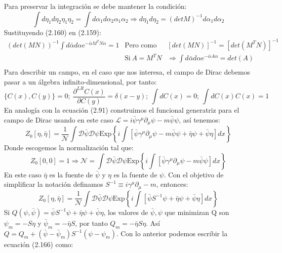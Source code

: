 Para preservar la integración se debe mantener la condición:
\begin{equation}
\int d\eta_{1}d\eta_{2}\eta_{1}\eta_{2}=\int d\alpha_{1}d\alpha_{2}\alpha_{1}\alpha_{2}\Rightarrow d\eta_{1}d\eta_{2}=(detM)^{-1}d\alpha_{1}d\alpha_{2}
\end{equation}
Sustituyendo (2.160) en (2.159):
\begin{eqnarray}
\nonumber (det(MN))^{-1}\int d\bar{\alpha}d\alpha e^{-\bar{\alpha}M^{T}N\alpha}=1&\text{Pero como}& \left[det(MN)\right]^{-1}=\left[det(M^{T}N)\right]^{-1}\\
\nonumber &\text{Si}\ A=M^TN&\Rightarrow \int d\bar{\alpha}d\alpha e^{-\bar{\alpha}A\alpha}=det(A)\\
\end{eqnarray}
Para describir un campo, en el caso que nos interesa, el campo de Dirac debemos pasar a un álgebra infinito-dimensional, por tanto:
\begin{equation}
\{C(x),C(y)\}=0; \ \frac{\partial^{LR}C(x)}{\partial C(y)}=\delta(x-y); \ \int dC(x)=0; \ \int dC(x)C(x)=1
\end{equation}
En analogía con la ecuación (2.91) construimos el funcional generatriz para el campo de Dirac usando en este caso $\mathcal{L}=i\bar{\psi}\gamma^{\mu}\partial_{\mu}\psi-m\bar{\psi}\psi$, así tenemos:
\begin{equation}
Z_{0}[\eta,\bar{\eta}]=\frac{1}{\mathcal{N}}\int\mathcal{D}\bar{\psi}\mathcal{\mathcal{D}}\psi\text{Exp}\left\{ i\int\left[\bar{\psi}\gamma^{\mu}\partial_{\mu}\psi-m\bar{\psi}\psi+\bar{\eta}\psi+\bar{\psi}\eta\right]dx\right\}
\end{equation}
Donde escogemos la normalización tal que:
\begin{equation}
Z_{0}[0,0]=1\Rightarrow\mathcal{N}=\int\mathcal{D}\bar{\psi}\mathcal{\mathcal{D}}\psi\text{Exp}\left\{ i\int\left[\bar{\psi}\gamma^{\mu}\partial_{\mu}\psi-m\bar{\psi}\psi\right]dx\right\} 
\end{equation}
En este caso $\bar{\eta}$ es la fuente de $\bar{\psi}$ y $\eta$ es la fuente de $\psi$. Con el objetivo de simplificar la notación definamos $S^{-1}\equiv i\gamma^{\mu}\partial_{\mu}-m$, entonces:
\begin{equation}
Z_{0}[\eta,\bar{\eta}]=\frac{1}{\mathcal{N}}\int\mathcal{D}\bar{\psi}\mathcal{\mathcal{D}}\psi\text{Exp}\left\{ i\int\left[\bar{\psi}S^{-1}\psi+\bar{\eta}\psi+\bar{\psi}\eta\right]dx\right\}
\end{equation} 
Si $Q(\psi,\bar{\psi})=\bar{\psi}S^{-1}\psi+\bar{\eta}\psi+\bar{\psi}\eta$, los valores de $\bar{\psi},\psi$ que minimizan Q son $\psi_m=-S\eta$ y $\bar{\psi}_m=-\bar{\eta}S$, por tanto $Q_m=-\bar{\eta}S\eta$. Así $Q=Q_m+(\bar{\psi}-\bar{\psi}_m)S^{-1}(\psi-\psi_m)$. Con lo anterior podemos escribir la ecuación (2.166) como:
